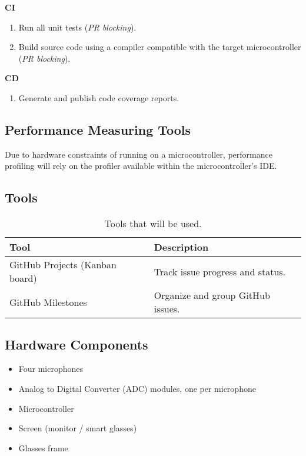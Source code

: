 \documentclass{article}
\begin{document}
\textbf{CI}
\begin{enumerate}
  \item Run all unit tests (\textit{PR blocking}).
  \item Build source code using a compiler compatible with the target microcontroller (\textit{PR blocking}).
\end{enumerate}
\textbf{CD} %
\begin{enumerate}
    \item Generate and publish code coverage reports.
\end{enumerate}

\subsection{Performance Measuring Tools}
Due to hardware constraints of running on a microcontroller, performance profiling will rely on the profiler available within the microcontroller’s IDE.

\subsection{Tools}
\begin{table}[h!]
\centering
\begin{tabularx}{\textwidth}{|l|X|}
\hline
\textbf{Tool} & \textbf{Description} \\ \hline
GitHub Projects (Kanban board) & Track issue progress and status. \\ \hline
GitHub Milestones & Organize and group GitHub issues. \\ \hline
\end{tabularx}
\caption{Tools that will be used.}
\end{table}

\subsection{Hardware Components}
\begin{itemize}
  \item Four microphones
  \item Analog to Digital Converter (ADC) modules, one per microphone
  \item Microcontroller
  \item Screen (monitor / smart glasses)
  \item Glasses frame
\end{itemize}
\end{document}
